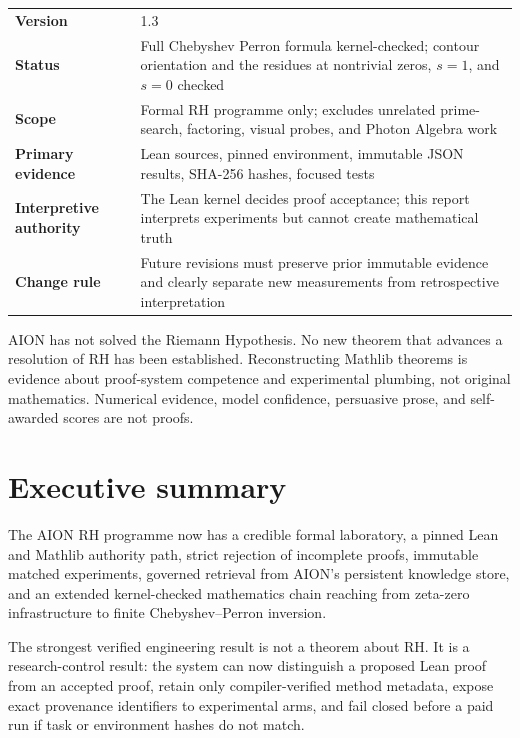 \documentclass[11pt,a4paper]{article}
\begin{document}
\begin{tabularx}{\textwidth}{>{\bfseries}p{37mm}X}
Version & 1.3 \\
Status & Full Chebyshev Perron formula kernel-checked; contour orientation and the residues at nontrivial zeros, $s=1$, and $s=0$ checked \\
Scope & Formal RH programme only; excludes unrelated prime-search, factoring, visual probes, and Photon Algebra work \\
Primary evidence & Lean sources, pinned environment, immutable JSON results, SHA-256 hashes, focused tests \\
Interpretive authority & The Lean kernel decides proof acceptance; this report interprets experiments but cannot create mathematical truth \\
Change rule & Future revisions must preserve prior immutable evidence and clearly separate new measurements from retrospective interpretation \\
\end{tabularx}

\begin{truthbox}
AION has not solved the Riemann Hypothesis. No new theorem that advances a
resolution of RH has been established. Reconstructing Mathlib theorems is
evidence about proof-system competence and experimental plumbing, not original
mathematics. Numerical evidence, model confidence, persuasive prose, and
self-awarded scores are not proofs.
\end{truthbox}

\clearpage
{}

\section{Executive summary}

The AION RH programme now has a credible formal laboratory, a pinned Lean and
Mathlib authority path, strict rejection of incomplete proofs, immutable
matched experiments, governed retrieval from AION's persistent knowledge
store, and an extended kernel-checked mathematics chain reaching from zeta-zero
infrastructure to finite Chebyshev--Perron inversion.

The strongest verified engineering result is not a theorem about RH. It is a
research-control result: the system can now distinguish a proposed Lean proof
from an accepted proof, retain only compiler-verified method metadata, expose
exact provenance identifiers to experimental arms, and fail closed before a
paid run if task or environment hashes do not match.
\end{document}

